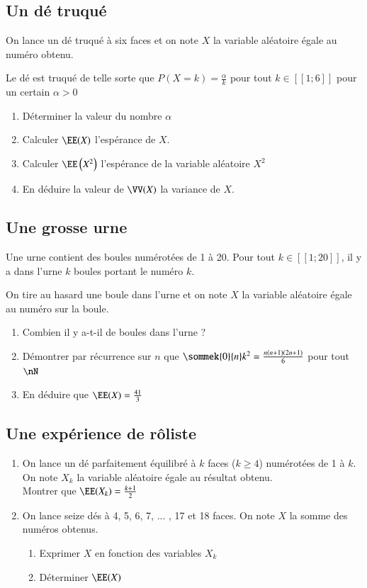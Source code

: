 \documentclass[oneside,12pt]{article}          %
\begin{document}
\subsection{Un dé truqué}
On lance un dé truqué à six faces et on note $X$ la variable aléatoire égale au numéro obtenu.

Le dé est truqué de telle sorte que $P(X=k)=\frac{\alpha}{k}$ pour tout $k\in[\![1;6]\!]$ pour un certain $\alpha>0$

\begin{enumerate}
    \item Déterminer la valeur du nombre $\alpha$
    \item Calculer $\EE(X)$ l'espérance de $X$.
    \item Calculer $\EE\left(X^2\right)$ l'espérance de la variable aléatoire $X^2$
    \item En déduire la valeur de $\VV(X)$ la variance de $X$.
\end{enumerate}



\subsection{Une grosse urne}
Une urne contient des boules numérotées de 1 à 20. Pour tout $k\in[\![1;20]\!]$, il y a dans l'urne $k$ boules portant le numéro $k$.

On tire au hasard une boule dans l'urne et on note $X$ la variable aléatoire égale au numéro sur la boule.

\begin{enumerate}
    \item Combien il y a-t-il de boules dans l'urne ?
    \item Démontrer par récurrence sur $n$ que $\sommek{0}{n}k^2=\frac{n(n+1)(2n+1)}{6}$ pour tout $\nN$
    \item En déduire que $\EE(X)=\frac{41}{3}$
\end{enumerate}



\subsection{Une expérience de rôliste}
\begin{enumerate}
    \item On lance un dé parfaitement équilibré à $k$ faces ($k\geq4$) numérotées de 1 à $k$.\\
    On note $X_k$ la variable aléatoire égale au résultat obtenu.\\
    Montrer que $\EE(X_k)=\frac{k+1}{2}$
    \item On lance seize dés à 4, 5, 6, 7, ... , 17 et 18 faces. On note $X$ la somme des numéros obtenus.
    \begin{enumerate}
    	\item Exprimer $X$ en fonction des variables $X_k$
    	\item Déterminer $\EE(X)$
    \end{enumerate}
\end{enumerate}
\end{document}
